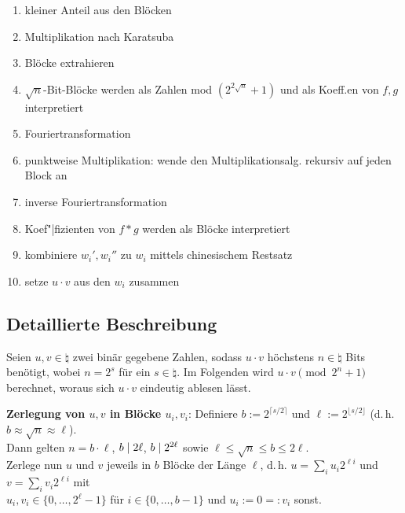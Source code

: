 \begin{enumerate}
    \item
    kleiner Anteil aus den Blöcken

    \item
    Multiplikation nach Karatsuba

    \item
    Blöcke extrahieren

    \item
    $\sqrt{n}$-Bit-Blöcke werden als Zahlen mod $(2^{2\sqrt{n}} + 1)$ und als Koeff.en
    von $f, g$ interpretiert

    \item
    Fouriertransformation

    \item
    punktweise Multiplikation: wende den Multiplikationsalg. rekursiv auf jeden Block an

    \item
    inverse Fouriertransformation

    \item
    Koef"|fizienten von $f \ast g$ werden als Blöcke interpretiert

    \item
    kombiniere $w_i', w_i''$ zu $w_i$ mittels chinesischem Restsatz

    \item
    setze $u \cdot v$ aus den $w_i$ zusammen
\end{enumerate}

\pagebreak

\subsection{%
    Detaillierte Beschreibung%
}

Seien $u, v \in \natural$ zwei binär gegebene Zahlen,
sodass $u \cdot v$ höchstens $n \in \natural$ Bits benötigt, wobei $n = 2^s$ für ein
$s \in \natural$.
Im Folgenden wird $u \cdot v \pmod{2^n + 1}$ berechnet, woraus sich $u \cdot v$ eindeutig ablesen
lässt.

\textbf{Zerlegung von $u, v$ in Blöcke $u_i, v_i$}:
Definiere $b := 2^{\lceil s/2 \rceil}$ und $\ell := 2^{\lfloor s/2 \rfloor}$
(d.\,h. $b \approx \sqrt{n} \approx \ell$).\\
Dann gelten $n = b \cdot \ell$, $b \mid 2\ell$, $b \mid 2^{2\ell}$ sowie
$\ell \le \sqrt{n} \le b \le 2\ell$.\\
Zerlege nun $u$ und $v$ jeweils in $b$ Blöcke der Länge $\ell$,
d.\,h. $u = \sum_i u_i 2^{\ell i}$ und $v = \sum_i v_i 2^{\ell i}$ mit\\
$u_i, v_i \in \{0, \dotsc, 2^\ell - 1\}$ für $i \in \{0, \dotsc, b - 1\}$ und
$u_i := 0 =: v_i$ sonst.

